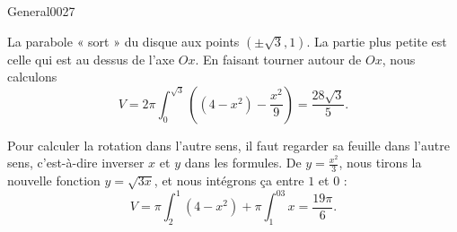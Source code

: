 \begin{corrige}{General0027}

La parabole « sort » du disque aux points $(\pm\sqrt{3},1)$. La partie plus petite est celle qui est au dessus de l'axe $Ox$. En faisant tourner autour de $Ox$, nous calculons 
\begin{equation}
	V=2\pi\int_{0}^{\sqrt{3}}\left( (4-x^2)-\frac{ x^2 }{ 9 } \right)=\frac{ 28\sqrt{3} }{ 5 }.
\end{equation}

Pour calculer la rotation dans l'autre sens, il faut regarder sa feuille dans l'autre sens, c'est-à-dire inverser $x$ et $y$ dans les formules. De $y=\frac{ x^2 }{ 3 }$, nous tirons la nouvelle fonction $y=\sqrt{3x}$, et nous intégrons ça entre $1$ et $0$ :
\begin{equation}
	V=\pi\int_2^1(4-x^2)+\pi\int_1^03x=\frac{ 19\pi }{ 6 }.
\end{equation}

\end{corrige}
